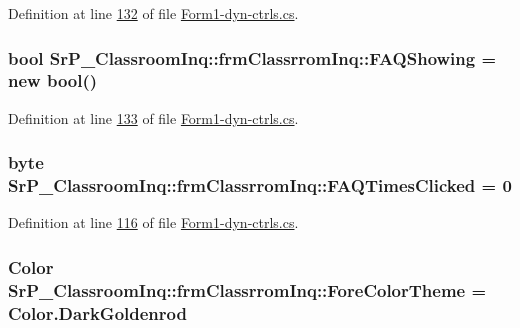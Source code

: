 \-Definition at line \hyperlink{_form1-dyn-ctrls_8cs_source_l00132}{132} of file \hyperlink{_form1-dyn-ctrls_8cs_source}{\-Form1-\/dyn-\/ctrls.\-cs}.

\hypertarget{class_sr_p___classroom_inq_1_1frm_classrrom_inq_a37a892198dda5bfa752c66df2debb199}{
\subsubsection[{\-F\-A\-Q\-Showing}]{\setlength{\rightskip}{0pt plus 5cm}bool {\bf \-Sr\-P\-\_\-\-Classroom\-Inq\-::frm\-Classrrom\-Inq\-::\-F\-A\-Q\-Showing} = new bool()}}
\label{class_sr_p___classroom_inq_1_1frm_classrrom_inq_a37a892198dda5bfa752c66df2debb199}


\-Definition at line \hyperlink{_form1-dyn-ctrls_8cs_source_l00133}{133} of file \hyperlink{_form1-dyn-ctrls_8cs_source}{\-Form1-\/dyn-\/ctrls.\-cs}.

\hypertarget{class_sr_p___classroom_inq_1_1frm_classrrom_inq_a81d1b27ebc720a6da339e1816eab4dfa}{
\subsubsection[{\-F\-A\-Q\-Times\-Clicked}]{\setlength{\rightskip}{0pt plus 5cm}byte {\bf \-Sr\-P\-\_\-\-Classroom\-Inq\-::frm\-Classrrom\-Inq\-::\-F\-A\-Q\-Times\-Clicked} = 0}}
\label{class_sr_p___classroom_inq_1_1frm_classrrom_inq_a81d1b27ebc720a6da339e1816eab4dfa}


\-Definition at line \hyperlink{_form1-dyn-ctrls_8cs_source_l00116}{116} of file \hyperlink{_form1-dyn-ctrls_8cs_source}{\-Form1-\/dyn-\/ctrls.\-cs}.

\hypertarget{class_sr_p___classroom_inq_1_1frm_classrrom_inq_ac239384db4489bc4b8b2a4cee9280849}{
\subsubsection[{\-Fore\-Color\-Theme}]{\setlength{\rightskip}{0pt plus 5cm}\-Color {\bf \-Sr\-P\-\_\-\-Classroom\-Inq\-::frm\-Classrrom\-Inq\-::\-Fore\-Color\-Theme} = \-Color.\-Dark\-Goldenrod}}
\label{class_sr_p___classroom_inq_1_1frm_classrrom_inq_ac239384db4489bc4b8b2a4cee9280849}


